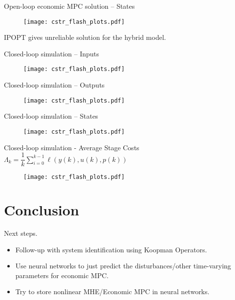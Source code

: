 \documentclass[xcolor=dvipsnames, 8pt]{beamer} %
\begin{document}
\begin{frame}{Open-loop economic MPC solution -- States}
	\vspace{-0.1in}
	\begin{figure}
	\centering
	\texttt{[image: cstr\_flash\_plots.pdf]}
	\end{figure}
	\vspace{-0.2in}
	IPOPT gives unreliable solution for the hybrid model.
\end{frame}

\begin{frame}{Closed-loop simulation -- Inputs}
		\begin{figure}
		\centering
		\texttt{[image: cstr\_flash\_plots.pdf]}
		\end{figure}
\end{frame}

\begin{frame}{Closed-loop simulation -- Outputs}
	\begin{figure}
	\centering
	\texttt{[image: cstr\_flash\_plots.pdf]}
	\end{figure}
\end{frame}

\begin{frame}{Closed-loop simulation -- States}
	\begin{figure}
	\centering
	\texttt{[image: cstr\_flash\_plots.pdf]}
	\end{figure}
\end{frame}

\begin{frame}{Closed-loop simulation - Average Stage Costs}
	\centering
	$\Lambda_k = \dfrac{1}{k}\sum_{i=0}^{k-1} \ell(y(k), u(k), p(k))$
	\vspace{-0.05in}
		\begin{figure}
		\centering
		\texttt{[image: cstr\_flash\_plots.pdf]}
		\end{figure}
\end{frame}

\section{Conclusion}
\begin{frame}{Next steps.}
\begin{itemize}
	\item Follow-up with system identification using Koopman Operators. 
	\item Use neural networks to just predict the disturbances/other time-varying parameters for economic MPC. 
	\item Try to store nonlinear MHE/Economic MPC in neural networks. 
\end{itemize}  
\end{frame}

%
%
\end{document}
